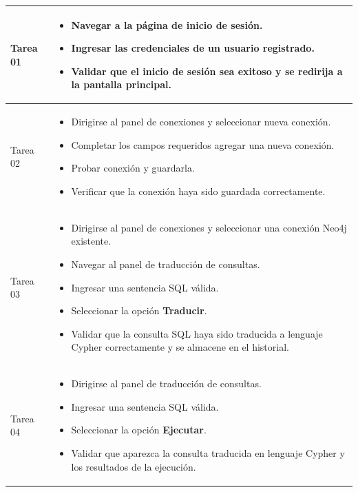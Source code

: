 \begin{longtable}[c]{|m{}|m{}|}
    Tarea 01 & \begin{itemize}
        \item Navegar a la página de inicio de sesión.
        \item Ingresar las credenciales de un usuario registrado.
        \item Validar que el inicio de sesión sea exitoso y se redirija a la pantalla principal.
    \end{itemize} \\
    \hline
    Tarea 02 & \begin{itemize}
        \item Dirigirse al panel de conexiones y seleccionar nueva conexión.
        \item Completar los campos requeridos agregar una nueva conexión.
        \item Probar conexión y guardarla.
        \item Verificar que la conexión haya sido guardada correctamente.
    \end{itemize} \\
    \hline
    Tarea 03 & \begin{itemize}
        \item Dirigirse al panel de conexiones y seleccionar una conexión Neo4j existente.
        \item Navegar al panel de traducción de consultas.
        \item Ingresar una sentencia SQL válida.
        \item Seleccionar la opción \textbf{Traducir}.
        \item Validar que la consulta SQL haya sido traducida a lenguaje Cypher correctamente y se almacene en el historial.
    \end{itemize} \\
    \hline
    Tarea 04 & \begin{itemize}
        \item Dirigirse al panel de traducción de consultas.
        \item Ingresar una sentencia SQL válida.
        \item Seleccionar la opción \textbf{Ejecutar}.
        \item Validar que aparezca la consulta traducida en lenguaje Cypher y los resultados de la ejecución.
    \end{itemize} \\
    \hline
\end{longtable}